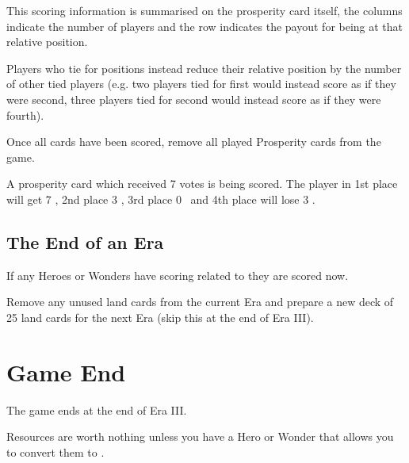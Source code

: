 \documentclass[10pt,twocolumn]{article}
\begin{document}
This scoring information is summarised on the prosperity card itself, the columns indicate the number of players and the row indicates the payout for being at that relative position.

Players who tie for positions instead reduce their relative position by the number of other tied players (e.g. two players tied for first would instead score as if they were second, three players tied for second would instead score as if they were fourth).

Once all cards have been scored, remove all played Prosperity cards from the game.

\begin{BoxExample}A prosperity card which received 7 votes is being scored. The player in 1st place will get 7 \vps, 2nd place 3 \vps, 3rd place 0 \vps\ and 4th place will lose 3 \vps.\end{BoxExample}

\subsection{The End of an Era}
If any Heroes or Wonders have scoring related to  they are scored now.

Remove any unused land cards from the current Era and prepare a new deck of 25 land cards for the next Era (skip this at the end of Era III).

\section{Game End}
The game ends at the end of Era III.

Resources are worth nothing unless you have a Hero or Wonder that allows you to convert them to \vps.
\end{document}
